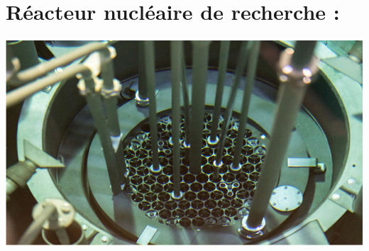 \documentclass{report}
\begin{document}
	\section{Réacteur nucléaire de recherche :}
	\begin{center} %
		\includegraphics[width=1\textwidth]{reacteur.png} 
	\end{center}
	
\end{document}
